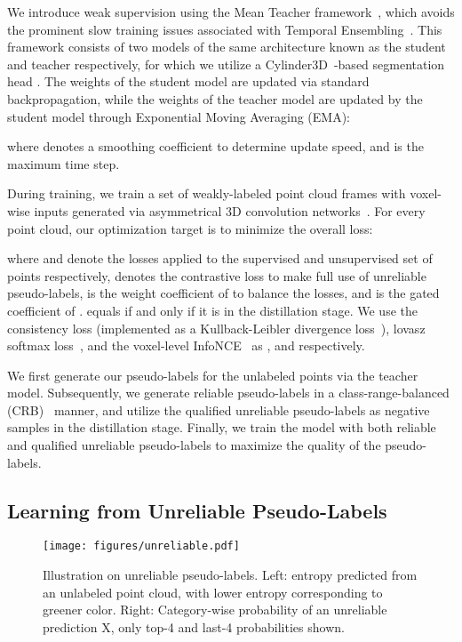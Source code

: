 \documentclass[10pt,twocolumn,letterpaper]{article}
\begin{document}
We introduce weak supervision using the Mean Teacher framework~\cite{tarvainen2017mean}, which avoids the prominent slow training issues associated with Temporal Ensembling~\cite{laine2017temporal}. This framework consists of two models of the same architecture known as the student and teacher respectively, for which we utilize a Cylinder3D~\cite{zhu2021cylindrical}-based segmentation head . The weights of the student model  are updated via standard backpropagation, while the weights of the teacher model  are updated by the student model through Exponential Moving Averaging (EMA):

where  denotes a smoothing coefficient to determine update speed, and  is the maximum time step.

During training, we train a set of weakly-labeled point cloud frames with voxel-wise inputs generated via asymmetrical 3D convolution networks~\cite{zhu2021cylindrical}. For every point cloud, our optimization target is to minimize the overall loss:

where  and  denote the losses applied to the supervised and unsupervised set of points respectively,  denotes the contrastive loss to make full use of unreliable pseudo-labels,  is the weight coefficient of  to balance the losses, and  is the gated coefficient of .  equals  if and only if it is in the distillation stage.
We use the consistency loss (implemented as a Kullback-Leibler divergence loss~\cite{hou2022pointtovoxel}), lovasz softmax loss~\cite{berman2018lovaszsoftmax}, and the voxel-level InfoNCE~\cite{oord2019representation} as ,  and  respectively.

We first generate our pseudo-labels for the unlabeled points via the teacher model. Subsequently, we generate reliable pseudo-labels in a class-range-balanced (CRB)~\cite{Unal_2022_CVPR} manner, and utilize the qualified unreliable pseudo-labels as negative samples in the distillation stage. Finally, we train the model with both reliable and qualified unreliable pseudo-labels to maximize the quality of the pseudo-labels.


\subsection{Learning from Unreliable Pseudo-Labels}
\label{sec:learning-from-unreliable-pseudo-labels}


\begin{figure}[thp]
    \centering
    \texttt{[image: figures/unreliable.pdf]}
    \caption{Illustration on unreliable pseudo-labels. Left: entropy predicted from an unlabeled point cloud, with lower entropy corresponding to greener color. Right: Category-wise probability of an unreliable prediction \colorbox[RGB]{115,0,231}{\textcolor{fg3_yellow}{\textsf{X}}}, only \textcolor{fg3_blue}{top-4} and \textcolor{fg3_orange}{last-4} probabilities shown.}
    \label{fig:unreliable}
    \vspace{-8pt}
\end{figure}
\end{document}
